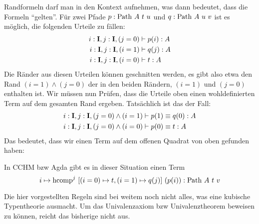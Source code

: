 Randformeln darf man in den Kontext aufnehmen, was dann bedeutet, dass die Formeln ``gelten''.
Für zwei Pfade $p:\mathrm{Path}\ A\ t\ u$ und $q:\mathrm{Path}\ A\ u\ v$ ist es möglich, die folgenden Urteile zu fällen:
\begin{align*}
  i:\mathbf{I},j:\mathbf{I},(j=0)&\vdash p(i) : A \\
  i:\mathbf{I},j:\mathbf{I},(i=1)&\vdash q(j) : A \\
  i:\mathbf{I},j:\mathbf{I},(i=0)&\vdash t   : A
\end{align*}
Die Ränder aus diesen Urteilen können geschnitten werden, es gibt also etwa den Rand $(i=1)\wedge(j=0)$ der in den beiden Rändern, $(i=1)$ und $(j=0)$ enthalten ist. Wir müssen nun Prüfen, dass die Urteile oben einen wohldefinierten Term auf dem gesamten Rand ergeben. Tatsächlich ist das der Fall:
\begin{align*}
  i:\mathbf{I},j:\mathbf{I},(j=0)\wedge(i=1)&\vdash p(1)\equiv q(0) : A \\
  i:\mathbf{I},j:\mathbf{I},(j=0)\wedge(i=0)&\vdash p(0)\equiv t : A
\end{align*}
Das bedeutet, dass wir einen Term auf dem offenen Quadrat von oben gefunden haben:
\begin{center}
\end{center}
In CCHM bzw Agda gibt es in dieser Situation einen Term
\[
  i\mapsto \mathrm{hcomp}^j\ [(i=0)\mapsto t, (i=1)\mapsto q(j)]\ (p(i)) : \mathrm{Path}\ A\ t\ v
\]

Die hier vorgestellten Regeln sind bei weitem noch nicht alles, was eine kubische Typentheorie ausmacht.
Um das Univalenzaxiom bzw Univalenztheorem beweisen zu können, reicht das bisherige nicht aus.